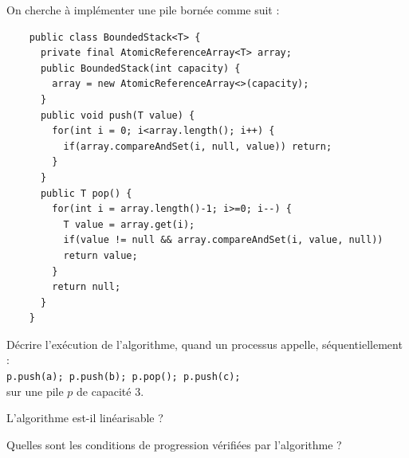 
\begingroup

\begin{exercice}
  On cherche à implémenter une pile bornée comme suit : 
  
  \begin{lstlisting}
    public class BoundedStack<T> {
      private final AtomicReferenceArray<T> array;
      public BoundedStack(int capacity) {
        array = new AtomicReferenceArray<>(capacity);
      }
      public void push(T value) {
        for(int i = 0; i<array.length(); i++) {
          if(array.compareAndSet(i, null, value)) return;
        }
      }
      public T pop() {
        for(int i = array.length()-1; i>=0; i--) {
          T value = array.get(i);
          if(value != null && array.compareAndSet(i, value, null)) 
          return value;
        }
        return null;
      }
    }
  \end{lstlisting}

  \begin{questions}
  \item Décrire l'exécution de l'algorithme, quand un processus appelle, séquentiellement :\\ \lstinline{p.push(a); p.push(b); p.pop(); p.push(c);}\\
    sur une pile $p$ de capacité 3. 
  \item L'algorithme est-il linéarisable ? 
  \item Quelles sont les conditions de progression vérifiées par l'algorithme ? 
  \end{questions}

\end{exercice}

\endgroup
\endinput
